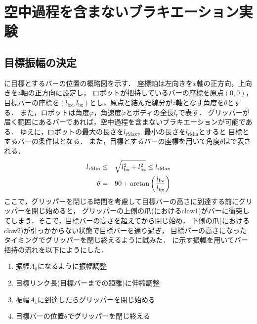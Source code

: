         \section{空中過程を含まないブラキエーション実験}

        \subsection{目標振幅の決定}
        に目標とするバーの位置の概略図を示す．
        座標軸は左向きを$x$軸の正方向，上向きを$z$軸の正方向に設定し，
        ロボットが把持しているバーの座標を原点$(0,0)$，
        目標バーの座標を$(l_{\mathrm{bx}},l_{\mathrm{bz}})$とし，原点と結んだ線分が$z$軸となす角度を$\theta$とする．
        また，ロボットは角度$\varphi$，角速度$\dot{\varphi}$とボディの全長$l_{\mathrm{r}}$で表す．
        グリッパーが届く範囲にあるバーであれば，空中過程を含まないブラキエーションが可能である．
        ゆえに，ロボットの最大の長さを$l_{\mathrm{rMax}}$，最小の長さを$l_{\mathrm{rMin}}$とすると
        目標とするバーの条件はとなる．
        また，目標とするバーの座標を用いて角度$\theta$はで表される．
        \begin{eqnarray}
                \equlabel{barRange}
                l_{\mathrm{rMin}} &\le& \sqrt{l_{\mathrm{bx}}^2+l_{\mathrm{bz}}^2} \le l_{\mathrm{rMax}}\\
                \equlabel{theta}
                \theta&=&90+\arctan{\left(\frac{l_{\mathrm{bz}}}{l_{\mathrm{bx}}}\right)}
                \end{eqnarray}  
        ここで，グリッパーを閉じる時間を考慮して目標バーの高さに到達する前にグリッパーを閉じ始めると，
        グリッパーの上側の爪(\figref{}におけるclaw1)がバーに衝突してしまう．そこで，目標バーの高さを超えてから閉じ始め，
        下側の爪(\figref{}におけるclaw2)が引っかからない状態で目標バーを通り過ぎ，
        目標バーの高さになったタイミングでグリッパーを閉じ終えるように試みた．
        に示す振幅を用いてバー把持の流れを以下にようにした．
        \begin{enumerate}
                \item 振幅$A_0$になるように振幅調整
                \item 目標リンク長(目標バーまでの距離)に伸縮調整
                \item 振幅$A_1$に到達したらグリッパーを閉じ始める
                \item 目標バーの位置$\theta$でグリッパーを閉じ終える
        \end{enumerate}      
